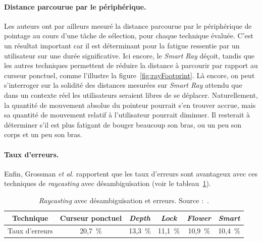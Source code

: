 	\paragraph{Distance parcourue par le périphérique.}
	Les auteurs ont par ailleurs mesuré la distance parcourue par le périphérique de pointage au cours d'une tâche de sélection, pour chaque technique évaluée. C'est un résultat important car il est déterminant pour la fatigue ressentie par un utilisateur sur une durée significative. Ici encore, le \emph{Smart Ray} déçoit, tandis que les autres techniques permettent de réduire la distance à parcourir par rapport au curseur ponctuel, comme l'illustre la figure~\ref{fig:rayFootprint}. Là encore, on peut s'interroger sur la solidité des distances mesurées sur \emph{Smart Ray} attendu que dans un contexte \og réel \fg{} les utilisateurs seraient libres de se déplacer. Naturellement, la quantité de mouvement absolue du pointeur pourrait s'en trouver accrue, mais sa quantité de mouvement relatif à l'utilisateur pourrait diminuer. Il resterait à déterminer s'il est plus fatigant de bouger beaucoup son bras, ou un peu son corps et un peu son bras.
	
	\paragraph{Taux d'erreurs.}
	Enfin, Grossman \emph{et al.} rapportent que les taux d'erreurs sont avantageux avec ces techniques de \emph{raycasting} avec désambiguïsation (voir le tableau~\ref{tab:rayErrors}).
	
	\begin{table}[htbp]
	\centering
	\begin{tabular}{c c c c c c}
		Technique		& Curseur ponctuel	& \emph{Depth}	& \emph{Lock}	& \emph{Flower}	& \emph{Smart}	\\ \hline
		Taux d'erreurs	& 20,7~\%{}			& 13,3~\%{}			& 11,1~\%{}			& 10,9~\%{}			& 10,4~\%{}			\bigstrut[t] \\
	\end{tabular}
	\caption[Taux d'erreurs pour les techniques de \emph{raycasting} avec désambiguïsation]{\emph{Raycasting} avec désambiguïsation et erreurs. Source :~\cite{grossman2006design}.}
	\label{tab:rayErrors}
	\end{table}
	
